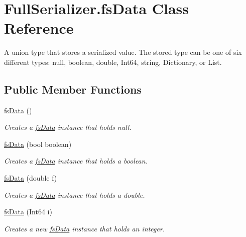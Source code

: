 \hypertarget{class_full_serializer_1_1fs_data}{}\section{Full\+Serializer.\+fs\+Data Class Reference}
\label{class_full_serializer_1_1fs_data}


A union type that stores a serialized value. The stored type can be one of six different types\+: null, boolean, double, Int64, string, Dictionary, or List.  


\subsection*{Public Member Functions}
\begin{DoxyCompactItemize}
\item 
\hyperlink{class_full_serializer_1_1fs_data_a9b5e13a72849cb6c6a6948fac87260c6}{fs\+Data} ()
\begin{DoxyCompactList}\small\item\em Creates a \hyperlink{class_full_serializer_1_1fs_data}{fs\+Data} instance that holds null. \end{DoxyCompactList}\item 
\hyperlink{class_full_serializer_1_1fs_data_ab0316b6b5db7d953fdfe6b352aa1af8e}{fs\+Data} (bool boolean)
\begin{DoxyCompactList}\small\item\em Creates a \hyperlink{class_full_serializer_1_1fs_data}{fs\+Data} instance that holds a boolean. \end{DoxyCompactList}\item 
\hyperlink{class_full_serializer_1_1fs_data_a694c04538e4e37df718316eff8e15635}{fs\+Data} (double f)
\begin{DoxyCompactList}\small\item\em Creates a \hyperlink{class_full_serializer_1_1fs_data}{fs\+Data} instance that holds a double. \end{DoxyCompactList}\item 
\hyperlink{class_full_serializer_1_1fs_data_ab942e5e4fb36b7e815ce0f4195cc84da}{fs\+Data} (Int64 i)
\begin{DoxyCompactList}\small\item\em Creates a new \hyperlink{class_full_serializer_1_1fs_data}{fs\+Data} instance that holds an integer. \end{DoxyCompactList}\item 

\end{DoxyCompactItemize}
